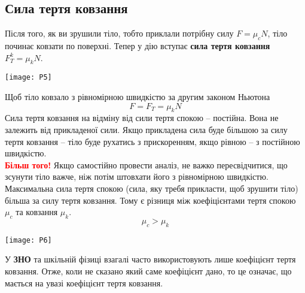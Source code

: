 \documentclass[a4paper,12pt]{article}
\begin{document}
\subsection{Сила тертя ковзання}
Після того, як ви зрушили тіло, тобто приклали потрібну силу $F = \mu_c N$, тіло починає ковзати по поверхні. Тепер у дію вступає \textcolor{EdErablue}{\textbf{сила тертя ковзання} $F^k_T = \mu_k N$}. \begin{center} \texttt{[image: P5]} \end{center}
Щоб тіло ковзало з рівномірною швидкістю за другим законом Ньютона $$\boxed{F = F_T = \mu_k N}$$
Сила тертя ковзання на відміну від сили тертя спокою – постійна. Вона не залежить від прикладеної сили. Якщо прикладена сила буде більшою за силу тертя ковзання – тіло буде рухатись з прискоренням, якщо рівною – з постійною швидкістю. \\

\textcolor{red}{\textbf{Більш того!}} Якщо самостійно провести аналіз, не важко пересвідчитися, що зсунути тіло важче, ніж потім штовхати його з рівномірною швидкістю. Максимальна сила тертя спокою (сила, яку требя прикласти, щоб зрушити тіло) більша за силу тертя ковзання. Тому є різниця між коефіцієнтами тертя спокою $\mu_c$ та ковзання $\mu_k$. $$\boxed{\mu_c > \mu_k}$$
\begin{center} \texttt{[image: P6]} \end{center}
У \textbf{ЗНО} та шкільній фізиці взагалі часто використовують лише коефіцієнт тертя ковзання. Отже, коли не сказано який саме коефіцієнт дано, то це означає, що мається на увазі коефіцієнт тертя ковзання. \newpage
\end{document}
